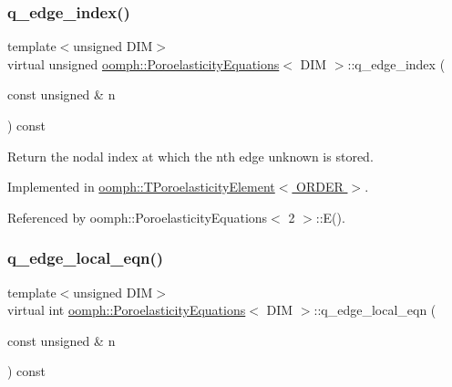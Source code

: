 \subsubsection{\texorpdfstring{q\+\_\+edge\+\_\+index()}{q\_edge\_index()}}
{\footnotesize\ttfamily template$<$unsigned D\+IM$>$ \\
virtual unsigned \hyperlink{classoomph_1_1PoroelasticityEquations}{oomph\+::\+Poroelasticity\+Equations}$<$ D\+IM $>$\+::q\+\_\+edge\+\_\+index (\begin{DoxyParamCaption}\item[{const unsigned \&}]{n }\end{DoxyParamCaption}) const\hspace{0.3cm}{\ttfamily [pure virtual]}}



Return the nodal index at which the nth edge unknown is stored. 



Implemented in \hyperlink{classoomph_1_1TPoroelasticityElement_a3486524ccf5ec2c3213a700a8d9beddd}{oomph\+::\+T\+Poroelasticity\+Element$<$ O\+R\+D\+E\+R $>$}.



Referenced by oomph\+::\+Poroelasticity\+Equations$<$ 2 $>$\+::\+E().

\mbox{\label{classoomph_1_1PoroelasticityEquations_a0a707c501fd4ae67a423de848845b04c}} 
\subsubsection{\texorpdfstring{q\+\_\+edge\+\_\+local\+\_\+eqn()}{q\_edge\_local\_eqn()}}
{\footnotesize\ttfamily template$<$unsigned D\+IM$>$ \\
virtual int \hyperlink{classoomph_1_1PoroelasticityEquations}{oomph\+::\+Poroelasticity\+Equations}$<$ D\+IM $>$\+::q\+\_\+edge\+\_\+local\+\_\+eqn (\begin{DoxyParamCaption}\item[{const unsigned \&}]{n }\end{DoxyParamCaption}) const\hspace{0.3cm}{\ttfamily [pure virtual]}}



